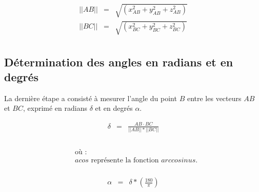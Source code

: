     \begin{equation*}
    \begin{array}{lclclclclcl}
    \displaystyle ||AB|| &=& \sqrt{(x_{AB}^2 + y_{AB}^2 + z_{AB}^2)}\\
    \displaystyle ||BC|| &=& \sqrt{(x_{BC}^2 + y_{BC}^2 + z_{BC}^2)}\\
    \end{array}
    \end{equation*}

\subsection{Détermination des angles en radians et en degrés}
    \label{annexes:calcul-detours-angles-produit-angle}

La dernière étape a consisté à mesurer l'angle du point \(B\) entre les vecteurs \(AB\) et \(BC\), exprimé en radians \(\delta\) et en degrés \(\alpha\).%

    \begin{equation*}
    \begin{array}{lclcl}
    \displaystyle \delta &=& \displaystyle\frac{AB \cdot BC}{||AB|| * ||BC||}\\\\
    \end{array}
    \end{equation*}

    \begin{align*}
    &\text{où~:} \\
    &acos \text{ représente la fonction $arccosinus$.}\\
    \end{align*}

    \begin{equation*}
    \begin{array}{lclclclclcl}
    \displaystyle \alpha &=& \delta * (\displaystyle\frac{180}{\pi})\\\\
    \end{array}
    \end{equation*}
